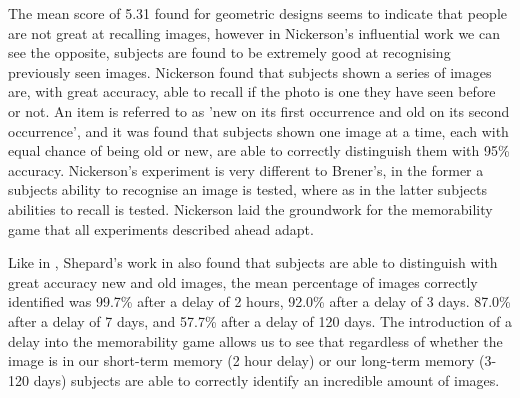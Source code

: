 \documentclass{UoYCSproject}
\begin{document}
% 
The mean score of 5.31 found for geometric designs seems to indicate that people are not great at recalling images, however in Nickerson's influential work \cite{NickersonShortTermMemory} we can see the opposite, subjects are found to be extremely good at recognising previously seen images. Nickerson found that subjects shown a series of images are, with great accuracy, able to recall if the photo is one they have seen before or not. An item is referred to as 'new on its first occurrence and old on its second occurrence'\cite[p.156]{NickersonShortTermMemory}, and it was found that subjects shown one image at a time, each with equal chance of being old or new, are able to correctly distinguish them with 95\% accuracy. Nickerson's experiment is very different to Brener's, in the former a subjects ability to recognise an image is tested, where as in the latter subjects abilities to recall is tested. Nickerson laid the groundwork for the memorability game that all experiments described ahead adapt.  

Like in \cite{NickersonShortTermMemory}, Shepard's work in \cite{ShepardRecognition} also found that subjects are able to distinguish with great accuracy new and old images, the mean percentage of images correctly identified was 99.7\% after a delay of 2 hours, 92.0\% after a delay of 3 days. 87.0\% after a delay of 7 days, and 57.7\% after a delay of 120 days. The introduction of a delay into the memorability game allows us to see that regardless of whether the image is in our short-term memory (2 hour delay) or our long-term memory (3-120 days) subjects are able to correctly identify an incredible amount of images.
\end{document}
